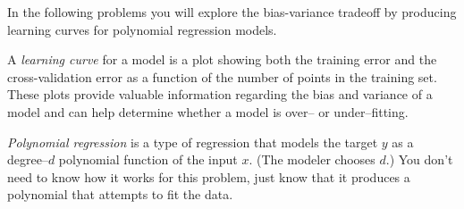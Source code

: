 \begin{solution}
  
\end{solution}

In the following problems you will explore the bias-variance tradeoff by producing learning curves for polynomial regression models.

A \emph{learning curve} for a model is a plot showing both the training error and the cross-validation error as a function of the number of points in the training set. These plots provide valuable information regarding the bias and variance of a model and can help determine whether a model is over-- or under--fitting.

\emph{Polynomial regression} is a type of regression that models the target $y$ as a degree--$d$ polynomial function of the input $x$. (The modeler chooses $d$.)  You don't need to know how it works for this problem, just know that it produces a polynomial that attempts to fit the data.

